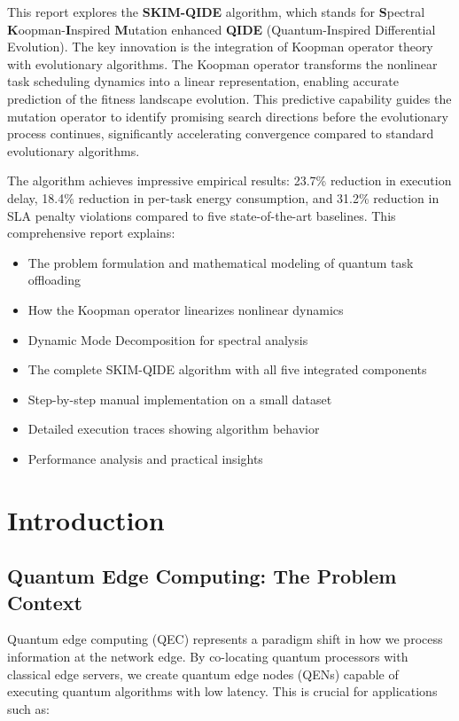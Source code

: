 \documentclass[12pt,a4paper]{article}
\begin{document}
This report explores the \textbf{SKIM-QIDE} algorithm, which stands for \textbf{S}pectral \textbf{K}oopman-\textbf{I}nspired \textbf{M}utation enhanced \textbf{QIDE} (Quantum-Inspired Differential Evolution). The key innovation is the integration of Koopman operator theory with evolutionary algorithms. The Koopman operator transforms the nonlinear task scheduling dynamics into a linear representation, enabling accurate prediction of the fitness landscape evolution. This predictive capability guides the mutation operator to identify promising search directions before the evolutionary process continues, significantly accelerating convergence compared to standard evolutionary algorithms.

The algorithm achieves impressive empirical results: 23.7\% reduction in execution delay, 18.4\% reduction in per-task energy consumption, and 31.2\% reduction in SLA penalty violations compared to five state-of-the-art baselines. This comprehensive report explains:

\begin{itemize}
  \item The problem formulation and mathematical modeling of quantum task offloading
  \item How the Koopman operator linearizes nonlinear dynamics
  \item Dynamic Mode Decomposition for spectral analysis
  \item The complete SKIM-QIDE algorithm with all five integrated components
  \item Step-by-step manual implementation on a small dataset
  \item Detailed execution traces showing algorithm behavior
  \item Performance analysis and practical insights
\end{itemize}

\section{Introduction}

\subsection{Quantum Edge Computing: The Problem Context}

Quantum edge computing (QEC) represents a paradigm shift in how we process information at the network edge. By co-locating quantum processors with classical edge servers, we create quantum edge nodes (QENs) capable of executing quantum algorithms with low latency. This is crucial for applications such as:
\end{document}
